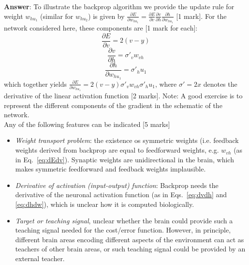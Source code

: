 \documentclass{article}
\newif\ifanswer
\begin{document}
\begin{enumerate}
\begin{enumerate}
  \ifanswer \textbf{Answer}: To illustrate the backprop algorithm we provide the update rule for weight $w_{hu_1}$ (similar for $w_{hu_2}$) is given by $\frac{\partial E}{\partial w_{hu_1}} = \frac{\partial E}{\partial v}\frac{\partial v}{\partial h}\frac{\partial h}{\partial w_{hu_1}}$ [1 mark]. For the network considered here, these components are [1 mark for each]:
\begin{equation}
\frac{\partial E}{\partial v} = 2(v-y)
\label{eq:dEdv}
\end{equation}
\begin{equation}
\frac{\partial v}{\partial h} = \sigma'_v w_{vh}
\label{eq:dvdh}
\end{equation}
\begin{equation}
\frac{\partial h}{\partial w_{hu_1}} = \sigma'_h u_1
\label{eq:dhdw}
\end{equation}
which together yields $\frac{\partial E}{\partial w_{hu_1}} = 2(v-y) \sigma'_v w_{vh} \sigma'_h u_1$, where $\sigma'=2x$ denotes the derivative of the linear activation function [2 marks]. Note: A good exercise is to represent the different components of the gradient in the schematic of the network.\\


Any of the following features can be indicated [5 marks]\\
\begin{itemize}
\item \textit{Weight transport problem}: the existence os symmetric weights (i.e. feedback weights derived from backprop are equal to feedforward weights, e.g. $w_{vh}$ (as in Eq.~\ref{eq:dEdv}). Synaptic weights are unidirectional in the brain, which makes symmetric feedforward and feedback weights implausible.\\

\item \textit{Derivative of activation (input-output) function}: Backprop needs the derivative of the neuronal activation function (as in Eqs.~\ref{eq:dvdh} and \ref{eq:dhdw}), which is unclear how it is computed biologically.\\

\item \textit{Target or teaching signal}, unclear whether the brain could provide such a teaching signal needed for the cost/error function. However, in principle, different brain areas encoding different aspects of the environment can act as teachers of other brain areas, or such teaching signal could be provided by an external teacher.\\


\end{itemize}
\end{enumerate}
\end{enumerate}
\end{document}
